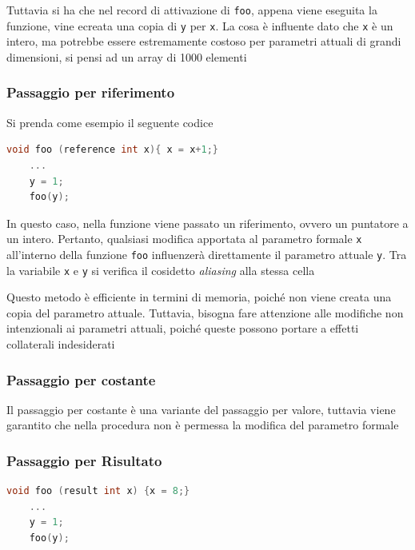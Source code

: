 Tuttavia si ha che nel record  di attivazione di \texttt{foo}, appena viene eseguita la funzione, vine ecreata una copia di \texttt{y} per \texttt{x}. La cosa è influente dato che \texttt{x} è un intero, ma potrebbe essere estremamente costoso per parametri attuali di grandi dimensioni, si pensi ad un array di 1000 elementi

\subsubsection{Passaggio per riferimento}
Si prenda come esempio il seguente codice

\begin{lstlisting}[language=C]
    void foo (reference int x){ x = x+1;}
    ...
    y = 1;
    foo(y);
\end{lstlisting}

In questo caso, nella funzione viene passato un riferimento, ovvero un puntatore a un intero. Pertanto, qualsiasi modifica apportata al parametro formale \texttt{x} all'interno della funzione \texttt{foo} influenzerà direttamente il parametro attuale \texttt{y}. Tra la variabile \texttt{x} e \texttt{y} si verifica il cosidetto \textit{aliasing} alla stessa cella

Questo metodo è efficiente in termini di memoria, poiché non viene creata una copia del parametro attuale. Tuttavia, bisogna fare attenzione alle modifiche non intenzionali ai parametri attuali, poiché queste possono portare a effetti collaterali indesiderati

\subsubsection{Passaggio per costante}

Il passaggio per costante è una variante del passaggio per valore, tuttavia viene garantito che nella procedura non è permessa la modifica del parametro formale



\subsubsection{Passaggio per Risultato}

\begin{lstlisting}[language=C]
    void foo (result int x) {x = 8;}
    ...
    y = 1;
    foo(y);
\end{lstlisting}

